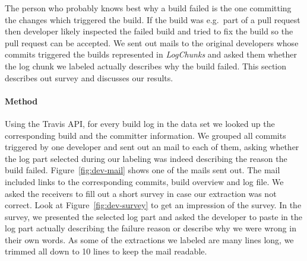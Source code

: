 \documentclass[\myrootdir/main.tex]{subfiles}
\begin{document}
The person who probably knows best why a build failed is the one committing the changes which triggered the build.
If the build was e.g.\ part of a pull request then developer likely inspected the failed build and tried to fix the build so the pull request can be accepted.
We sent out mails to the original developers whose commits triggered the builds represented in \emph{LogChunks} and asked them whether the log chunk we labeled actually describes why the build failed.
This section describes out survey and discusses our results.

\paragraph{Method}
Using the Travis API, for every build log in the data set we looked up the corresponding build and the committer information.
We grouped all commits triggered by one developer and sent out an mail to each of them, asking whether the log part selected during our labeling was indeed describing the reason the build failed.
Figure~\ref{fig:dev-mail} shows one of the mails sent out.
The mail included links to the corresponding commits, build overview and log file.
We asked the receivers to fill out a short survey in case our extraction was not correct.
Look at Figure~\ref{fig:dev-survey} to get an impression of the survey.
In the survey, we presented the selected log part and asked the developer to paste in the log part actually describing the failure reason or describe why we were wrong in their own words.
As some of the extractions we labeled are many lines long, we trimmed all down to 10 lines to keep the mail readable.
\end{document}
